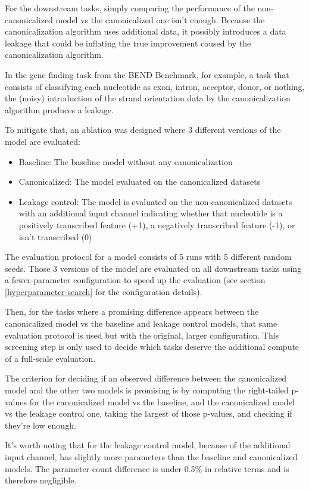 \documentclass[   ]{article}
\begin{document}
For the downstream tasks, simply comparing the performance of the non-canonicalized model vs the canonicalized one isn't enough. Because the canonicalization algorithm uses additional data, it possibly introduces a data leakage that could be inflating the true improvement caused by the canonicalization algorithm.

In the gene finding task from the BEND Benchmark, for example, a task that
consists of classifying each nucleotide as exon, intron, acceptor,
donor, or nothing, the (noisy) introduction of the strand orientation data by the canonicalization algorithm produces a leakage.

To mitigate that, an ablation was designed where 3 different versions of the model are evaluated:
\begin{itemize}
	\item Baseline: The baseline model without any canonicalization
	\item Canonicalized: The model evaluated on the canonicalized datasets
	\item Leakage control: The model is evaluated on the non-canonicalized datasets with an additional input channel indicating whether that nucleotide is a positively transcribed feature (+1), a negatively transcribed feature (-1), or isn't transcribed (0)
\end{itemize}

The evaluation protocol for a model consists of 5 runs with 5 different random seeds. Those 3 versions of the model are evaluated on all downstream tasks using a fewer-parameter configuration to speed up the evaluation (see section \ref{hyperparameter-search} for the configuration details).

Then, for the tasks where a promising difference appears between the canonicalized model vs the baseline and leakage control models, that same evaluation protocol is used but with the original, larger configuration. This screening step is only used to decide which tasks deserve the additional compute of a full-scale evaluation.

The criterion for deciding if an observed difference between the canonicalized model and the other two models is promising is by computing the right-tailed p-values for the canonicalized model vs the baseline, and the canonicalized model vs the leakage control one, taking the largest of those p-values, and checking if they're low enough.

It's worth noting that for the leakage control model, because of the additional input channel, has slightly more parameters than the baseline and canonicalized models. The parameter count difference is under 0.5\% in relative terms and is therefore negligible.
\end{document}
